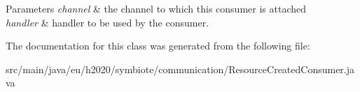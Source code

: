 \begin{DoxyParams}{Parameters}
{\em channel} & the channel to which this consumer is attached \\
\hline
{\em handler} & handler to be used by the consumer. \\
\hline
\end{DoxyParams}


The documentation for this class was generated from the following file\+:\begin{DoxyCompactItemize}
\item 
src/main/java/eu/h2020/symbiote/communication/Resource\+Created\+Consumer.\+java\end{DoxyCompactItemize}
